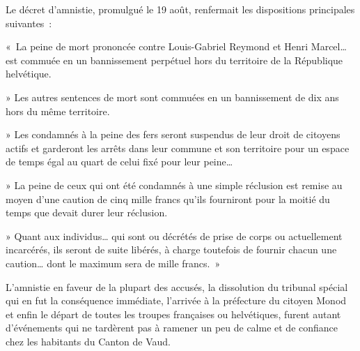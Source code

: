 \documentclass[french,twoside]{book} %
\newenvironment{quoteblock}%
  {\begin{quoting}}
  {\end{quoting}}
\newenvironment{quotebar}{%
    \def\FrameCommand{{\color{rubric!10!}\vrule width 0.5em} \hspace{0.9em}}%
    \def\OuterFrameSep{\itemsep} %
    \MakeFramed {\advance\hsize-\width \FrameRestore}
  }%
  {%
    \endMakeFramed
  }
\renewenvironment{quoteblock}%
  {%
    \savenotes
    \setstretch{0.9}
    \normalfont
    \begin{quotebar}
  }
  {%
    \end{quotebar}
    \spewnotes
  }
\begin{document}
\noindent Le décret d’amnistie, promulgué le 19 août, renfermait les dispositions principales suivantes :\par

\begin{quoteblock}
 \noindent « La peine de mort prononcée contre Louis-Gabriel Reymond et Henri Marcel… est commuée en un bannissement perpétuel hors du territoire de la République helvétique.\par
 » Les autres sentences de mort sont commuées en un bannissement de dix ans hors du même territoire.\par
 » Les condamnés à la peine des fers seront suspendus de leur droit de citoyens actifs et garderont les arrêts dans leur commune et son territoire pour un espace de temps égal au quart de celui fixé pour leur peine…\par
 » La peine de ceux qui ont été condamnés à une simple réclusion est remise au moyen d’une caution de cinq mille francs qu’ils fourniront pour la moitié du temps que devait durer leur réclusion.\par
 » Quant aux individus… qui sont ou décrétés de prise de corps ou actuellement incarcérés, ils seront de suite libérés, à charge toutefois de fournir chacun une caution… dont le maximum sera de mille francs. »
 \end{quoteblock}

\noindent L’amnistie en faveur de la plupart des accusés, la dissolution du tribunal spécial qui en fut la conséquence immédiate, l’arrivée à la préfecture du citoyen Monod et enfin le départ de toutes les troupes françaises ou helvétiques, furent autant d’événements qui ne tardèrent pas à ramener un peu de calme et de confiance chez les habitants du Canton de Vaud.
\end{document}
